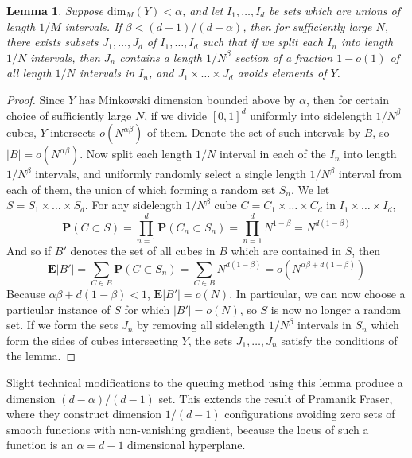 \documentclass{report}
\theoremstyle{plain}
\newtheorem{lemma}{Lemma}
\theoremstyle{plain}
\begin{document}
\begin{lemma}
    Suppose $\text{dim}_M(Y) < \alpha$, and let $I_1, \dots, I_d$ be sets which are unions of length $1/M$ intervals. If $\beta < (d - 1)/(d - \alpha)$, then for sufficiently large $N$, there exists subsets $J_1, \dots, J_d$ of $I_1, \dots, I_d$ such that if we split each $I_n$ into length $1/N$ intervals, then $J_n$ contains a length $1/N^\beta$ section of a fraction $1 - o(1)$ of all length $1/N$ intervals in $I_n$, and $J_1 \times \dots \times J_d$ avoids elements of $Y$.
\end{lemma}
\begin{proof}
    Since $Y$ has Minkowski dimension bounded above by $\alpha$, then for certain choice of sufficiently large $N$, if we divide $[0,1]^d$ uniformly into sidelength $1/N^\beta$ cubes, $Y$ intersects $o(N^{\alpha \beta})$ of them. Denote the set of such intervals by $B$, so $|B| = o(N^{\alpha \beta})$. Now split each length $1/N$ interval in each of the $I_n$ into length $1/N^\beta$ intervals, and uniformly randomly select a single length $1/N^\beta$ interval from each of them, the union of which forming a random set $S_n$. We let $S = S_1 \times \dots \times S_d$. For any sidelength $1/N^\beta$ cube $C = C_1 \times \dots \times C_d$ in $I_1 \times \dots \times I_d$,
    \[ \mathbf{P}(C \subset S) = \prod_{n = 1}^d \mathbf{P}(C_n \subset S_n) = \prod_{n = 1}^d N^{1 - \beta} = N^{d(1 - \beta)} \]
    And so if $B'$ denotes the set of all cubes in $B$ which are contained in $S$, then
    \[ \mathbf{E}|B'| = \sum_{C \in B} \mathbf{P}(C \subset S_n) = \sum_{C \in B} N^{d(1 - \beta)} = o \left( N^{\alpha \beta + d(1 - \beta)} \right) \]
    Because $\alpha \beta + d (1 - \beta) < 1$, $\mathbf{E}|B'| = o(N)$. In particular, we can now choose a particular instance of $S$ for which $|B'| = o(N)$, so $S$ is now no longer a random set. If we form the sets $J_n$ by removing all sidelength $1/N^\beta$ intervals in $S_n$ which form the sides of cubes intersecting $Y$, the sets $J_1, \dots, J_n$ satisfy the conditions of the lemma.
\end{proof}

Slight technical modifications to the queuing method using this lemma produce a dimension $(d-\alpha)/(d-1)$ set. This extends the result of Pramanik Fraser, where they construct dimension $1/(d-1)$ configurations avoiding zero sets of smooth functions with non-vanishing gradient, because the locus of such a function is an $\alpha = d - 1$ dimensional hyperplane.
\end{document}

